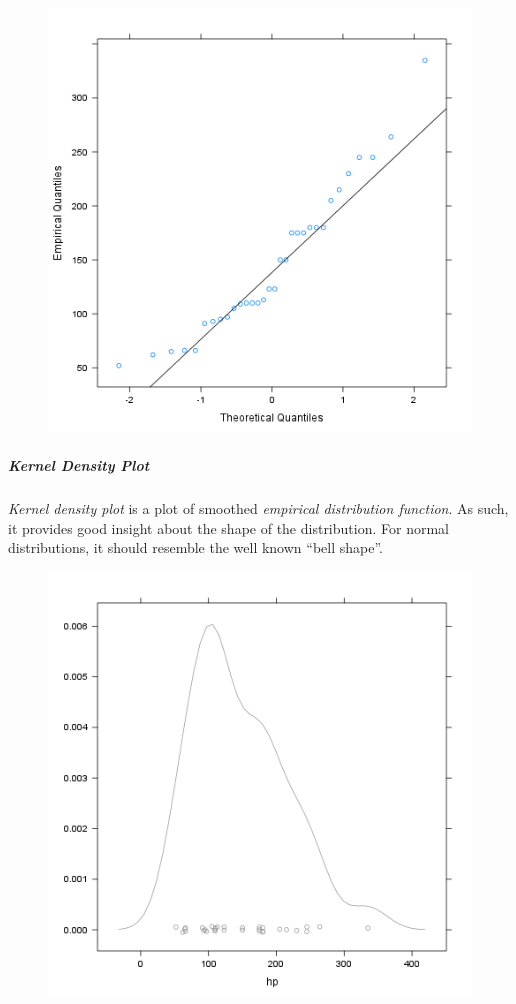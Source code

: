 \documentclass[]{article}
\makeatletter
\def\maxwidth{\ifdim\Gin@nat@width>\linewidth\linewidth
\else\Gin@nat@width\fi}
\let\Oldincludegraphics\includegraphics
\renewcommand{\includegraphics}[1]{\Oldincludegraphics[width=\maxwidth]{#1}}
\makeatother
\begin{document}
\begin{figure}[htbp]
\centering
\includegraphics{17e5c77b83c6e3e636487406decc14c7.png}
\caption{}
\end{figure}

\subparagraph{Kernel Density Plot}

\emph{Kernel density plot} is a plot of smoothed \emph{empirical
distribution function}. As such, it provides good insight about the
shape of the distribution. For normal distributions, it should resemble
the well known ``bell shape''.

\begin{figure}[htbp]
\centering
\includegraphics{c1ac92e4f5aa993da03a59fbb3394fb0.png}
\caption{}
\end{figure}
\end{document}
